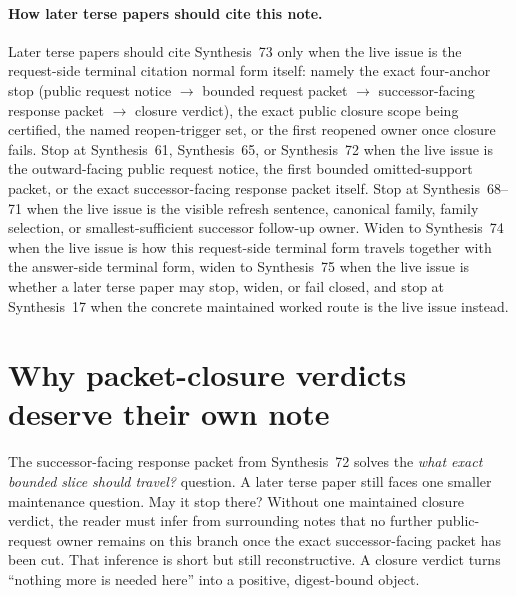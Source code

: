 \documentclass[11pt]{article}
\begin{document}
\paragraph{How later terse papers should cite this note.}
Later terse papers should cite Synthesis~73 only when the live issue is the request-side terminal citation normal form itself: namely the exact four-anchor stop (public request notice $\to$ bounded request packet $\to$ successor-facing response packet $\to$ closure verdict), the exact public closure scope being certified, the named reopen-trigger set, or the first reopened owner once closure fails. Stop at Synthesis~61, Synthesis~65, or Synthesis~72 when the live issue is the outward-facing public request notice, the first bounded omitted-support packet, or the exact successor-facing response packet itself. Stop at Synthesis~68--71 when the live issue is the visible refresh sentence, canonical family, family selection, or smallest-sufficient successor follow-up owner. Widen to Synthesis~74 when the live issue is how this request-side terminal form travels together with the answer-side terminal form, widen to Synthesis~75 when the live issue is whether a later terse paper may stop, widen, or fail closed, and stop at Synthesis~17 when the concrete maintained worked route is the live issue instead.\cite{series:publicrequestnotices,series:publicrequestresponsepackets,series:publicrequestresponsepacketrefreshnotices,series:publicrequestresponsepacketrefreshnoticenormalforms,series:publicrequestresponsepacketrefreshnoticeselections,series:publicrequestresponsepacketrefreshresponsemenus,series:publicrequestresponsepacketrefreshresponsepackets,series:pairedterminalcitationdiscipline,series:pairedterminalcutoverrule,series:workedexample}

\section{Why packet-closure verdicts deserve their own note}
The successor-facing response packet from Synthesis~72 solves the \emph{what exact bounded slice should travel?} question.
A later terse paper still faces one smaller maintenance question.
May it stop there?
Without one maintained closure verdict, the reader must infer from surrounding notes that no further public-request owner remains on this branch once the exact successor-facing packet has been cut.
That inference is short but still reconstructive.
A closure verdict turns ``nothing more is needed here'' into a positive, digest-bound object.
\end{document}
